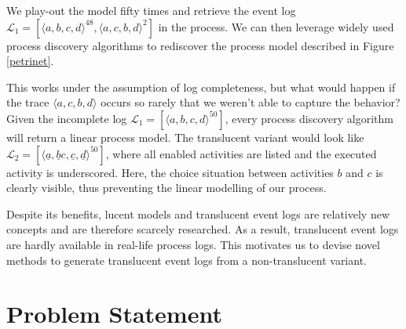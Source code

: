We play-out the model fifty times and retrieve the event log $\mathcal{L}_1 = [ \langle a, b, c, d \rangle ^{48}, \langle a, c, b, d \rangle^2 ]$ in the process. We can then leverage widely used process discovery algorithms to rediscover the process model described in Figure \ref{petrinet}. 

This works under the assumption of log completeness, but what would happen if the trace $\langle a, c, b, d \rangle$ occurs so rarely that we weren't able to capture the behavior? Given the incomplete log $\mathcal{L}_1 = [ \langle a, b, c, d \rangle ^{50}]$, every process discovery algorithm will return a linear process model. The translucent variant would look like $\mathcal{L}_2 = [ \langle \underline{a}, \underline{b}c,  \underline{c},  \underline{d} \rangle ^{50}]$, where all enabled activities are listed and the executed activity is underscored. Here, the choice situation between activities $b$ and $c$ is clearly visible, thus preventing the linear modelling of our process.


Despite its benefits, lucent models and translucent event logs are relatively new concepts and are therefore scarcely researched. As a result, translucent event logs are hardly available in real-life process logs. This motivates us to devise novel methods to generate translucent event logs from a non-translucent variant.

\section{Problem Statement}
\label{sec:intro_ssec:probs}

\begin{comment}
    In this section, you introduce the problem that you are solving.
A good problem statement is a concise, more general statement of the example motivation that you have used in the motivation section.

For example, in the case of our previous example:

\enquote{Real event data contains infrequent and incomplete behavior. 
Furthermore, different recordings of the same activity may refer to conceptually different contextual executions.
Existing, state-of-the-art process discovery algorithms cannot discover process models of adequate quality, given event data of the previously described form.}
\end{comment}

